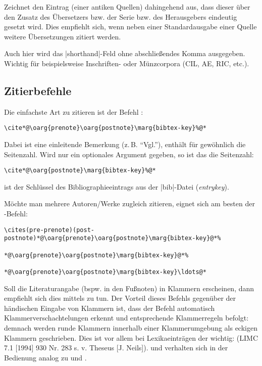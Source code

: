\documentclass[a4paper,10pt,ngerman]{ltxdoc}
\begin{document}
 Zeichnet den Eintrag (einer antiken Quellen) dahingehend aus,
dass dieser über den Zusatz des Übersetzers bzw. der Serie bzw. des Herausgebers eindeutig gesetzt wird.
Dies empfiehlt sich, wenn  neben einer Standardausgabe einer Quelle weitere Übersetzungen zitiert werden.

  Auch hier wird das |shorthand|-Feld ohne abschließendes Komma ausgegeben. 
Wichtig für beispielsweise Inschriften- oder Münzcorpora (CIL, AE, RIC, etc.). 



\subsection{Zitierbefehle}\label{cite_commands}
\DescribeMacro{\cite}  Die einfachste Art zu zitieren ist der Befehl :
\begin{lstlisting}
\cite*@\oarg{prenote}\oarg{postnote}\marg{bibtex-key}%@*
\end{lstlisting}

Dabei ist  eine einleitende Bemerkung (z.\,B. \enquote{Vgl.}),  enthält für gewöhnlich die Seitenzahl. 
Wird nur ein optionales Argument gegeben, so ist das die Seitenzahl:
\begin{lstlisting}
\cite*@\oarg{postnote}\marg{bibtex-key}%@*
\end{lstlisting}

 ist der Schlüssel des Bibliographieeintrags aus der |bib|-Datei (\emph{entrykey}).

\DescribeMacro{\cites}  Möchte man mehrere Autoren/Werke zugleich zitieren, eignet sich am besten der -Befehl:
\begin{lstlisting}
\cites(pre-prenote)(post-postnote)*@\oarg{prenote}\oarg{postnote}\marg{bibtex-key}@*%
 																	*@\oarg{prenote}\oarg{postnote}\marg{bibtex-key}@*%
 																	*@\oarg{prenote}\oarg{postnote}\marg{bibtex-key}\ldots@*
\end{lstlisting}
 
\DescribeMacro{\parencite}  \DescribeMacro{\parencites}  Soll die Literaturangabe (bspw. in den Fußnoten) in Klammern erscheinen, dann empfiehlt sich dies mittels  zu tun.
Der Vorteil dieses Befehls gegenüber der händischen Eingabe von Klammern ist, dass der Befehl automatisch Klammerverschachtelungen erkennt und entsprechende Klammerregeln befolgt: demnach werden runde Klammern innerhalb einer Klammerumgebung als eckigen Klammern geschrieben.
Dies ist vor allem bei Lexikaeinträgen der wichtig: (LIMC 7.1 [1994] 930 Nr. 283 s. v. Theseus [J. Neils]).
 und  verhalten sich in der Bedienung analog zu  und .
 
\end{document}
